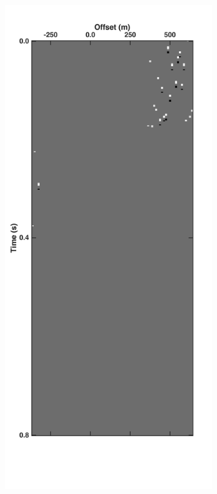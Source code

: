 \begin{figure}
\begin{subfigure}[t]{0.25\textwidth}
		\caption{}
		\label{fig:Ch-Theory-Threshold}
	\end{subfigure}
	\begin{subfigure}[t]{0.25\textwidth}
		\includegraphics[width=\textwidth]{Plots/Mahdad/5iter/NoiseCRG_rec30}	

\end{subfigure}
\end{figure}
